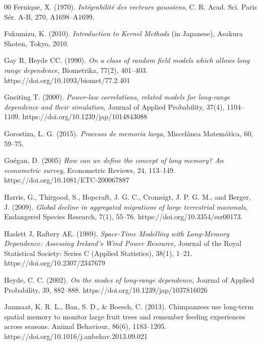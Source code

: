 \documentclass[preprint,12pt,authoryear]{elsarticle}
\begin{document}
\begin{thebibliography}{00}
  Fernique, X. (1970).
  \textit{Intégrabilité des vecteurs gaussiens},
  C. R. Acad. Sci. Paris Sér. A-B,
  270,
  A1698–A1699.

  Fukumizu, K. (2010).
  \textit{Introduction to Kernel Methods} (in Japanese),
  Asakura Shoten, Tokyo,
  2010.

Gay R, Heyde CC. (1990).
\textit{On a class of random field models which allows long range dependence,}
Biometrika, 77(2), 401--403.
https://doi.org/10.1093/biomet/77.2.401

Gneiting T. (2000).
\textit{Power-law correlations, related models for long-range dependence and their simulation,}
Journal of Applied Probability, 37(4), 1104--1109.
https://doi.org/10.1239/jap/1014843088

  Gorostiza, L. G. (2015).
  \textit{Procesos de memoria larga},
  Miscelánea Matemática,
  60,
  59–75.

  Guégan, D. (2005)
  \textit{How can we define the concept of long memory? An econometric survey},
  Econometric Reviews,
  24,
  113–149. https://doi.org/10.1081/ETC-200067887

  Harris, G., Thirgood, S., Hopcraft, J. G. C., Cromsigt, J. P. G. M., and Berger, J. (2009).
  \textit{Global decline in aggregated migrations of large terrestrial mammals},
  Endangered Species Research,
  7(1),
  55--76.
  https://doi.org/10.3354/esr00173.

Haslett J, Raftery AE. (1989).
\textit{Space-Time Modelling with Long-Memory Dependence: Assessing Ireland's Wind Power Resource,}
Journal of the Royal Statistical Society: Series C (Applied Statistics), 38(1), 1--21.
https://doi.org/10.2307/2347679

  Heyde, C. C. (2002).
  \textit{On the modes of long-range dependence},
  Journal of Applied Probability,
  39,
  882–888. https://doi.org/10.1239/jap/1037816026

 Janmaat, K. R. L., Ban, S. D., \& Boesch, C. (2013). Chimpanzees use long-term spatial memory to monitor large fruit trees and remember feeding experiences across seasons. Animal Behaviour, 86(6), 1183–1205.  https://doi.org/10.1016/j.anbehav.2013.09.021


\end{thebibliography}
\end{document}
